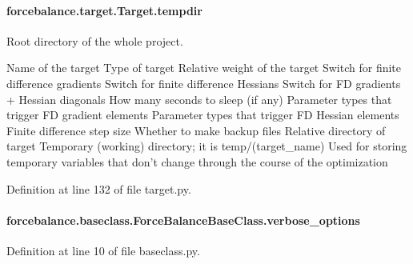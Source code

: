 \hypertarget{classforcebalance_1_1target_1_1Target_aa1f01b5b78db253b5b66384ed11ed193}{
\paragraph[{tempdir}]{\setlength{\rightskip}{0pt plus 5cm}forcebalance.\-target.\-Target.\-tempdir\hspace{0.3cm}{\ttfamily [inherited]}}}\label{classforcebalance_1_1target_1_1Target_aa1f01b5b78db253b5b66384ed11ed193}


Root directory of the whole project. 

Name of the target Type of target Relative weight of the target Switch for finite difference gradients Switch for finite difference Hessians Switch for F\-D gradients + Hessian diagonals How many seconds to sleep (if any) Parameter types that trigger F\-D gradient elements Parameter types that trigger F\-D Hessian elements Finite difference step size Whether to make backup files Relative directory of target Temporary (working) directory; it is temp/(target\-\_\-name) Used for storing temporary variables that don't change through the course of the optimization 

Definition at line 132 of file target.\-py.

\hypertarget{classforcebalance_1_1baseclass_1_1ForceBalanceBaseClass_a8088e1e20cbd6bc175fb9c9fe9fa0f18}{
\paragraph[{verbose\-\_\-options}]{\setlength{\rightskip}{0pt plus 5cm}forcebalance.\-baseclass.\-Force\-Balance\-Base\-Class.\-verbose\-\_\-options\hspace{0.3cm}{\ttfamily [inherited]}}}\label{classforcebalance_1_1baseclass_1_1ForceBalanceBaseClass_a8088e1e20cbd6bc175fb9c9fe9fa0f18}


Definition at line 10 of file baseclass.\-py.


